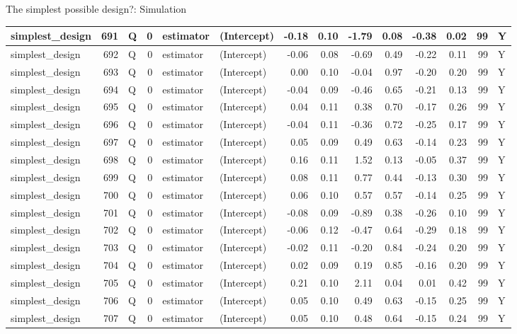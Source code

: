 \documentclass[
  11pt,
  ignorenonframetext,
]{beamer}
\begin{document}
\begin{frame}[fragile]{The simplest possible design?: Simulation}
\begin{tabular}{l|r|l|r|l|l|r|r|r|r|r|r|r|l}
\hline
simplest\_design & 691 & Q & 0 & estimator & (Intercept) & -0.18 & 0.10 & -1.79 & 0.08 & -0.38 & 0.02 & 99 & Y\\
\hline
simplest\_design & 692 & Q & 0 & estimator & (Intercept) & -0.06 & 0.08 & -0.69 & 0.49 & -0.22 & 0.11 & 99 & Y\\
\hline
simplest\_design & 693 & Q & 0 & estimator & (Intercept) & 0.00 & 0.10 & -0.04 & 0.97 & -0.20 & 0.20 & 99 & Y\\
\hline
simplest\_design & 694 & Q & 0 & estimator & (Intercept) & -0.04 & 0.09 & -0.46 & 0.65 & -0.21 & 0.13 & 99 & Y\\
\hline
simplest\_design & 695 & Q & 0 & estimator & (Intercept) & 0.04 & 0.11 & 0.38 & 0.70 & -0.17 & 0.26 & 99 & Y\\
\hline
simplest\_design & 696 & Q & 0 & estimator & (Intercept) & -0.04 & 0.11 & -0.36 & 0.72 & -0.25 & 0.17 & 99 & Y\\
\hline
simplest\_design & 697 & Q & 0 & estimator & (Intercept) & 0.05 & 0.09 & 0.49 & 0.63 & -0.14 & 0.23 & 99 & Y\\
\hline
simplest\_design & 698 & Q & 0 & estimator & (Intercept) & 0.16 & 0.11 & 1.52 & 0.13 & -0.05 & 0.37 & 99 & Y\\
\hline
simplest\_design & 699 & Q & 0 & estimator & (Intercept) & 0.08 & 0.11 & 0.77 & 0.44 & -0.13 & 0.30 & 99 & Y\\
\hline
simplest\_design & 700 & Q & 0 & estimator & (Intercept) & 0.06 & 0.10 & 0.57 & 0.57 & -0.14 & 0.25 & 99 & Y\\
\hline
simplest\_design & 701 & Q & 0 & estimator & (Intercept) & -0.08 & 0.09 & -0.89 & 0.38 & -0.26 & 0.10 & 99 & Y\\
\hline
simplest\_design & 702 & Q & 0 & estimator & (Intercept) & -0.06 & 0.12 & -0.47 & 0.64 & -0.29 & 0.18 & 99 & Y\\
\hline
simplest\_design & 703 & Q & 0 & estimator & (Intercept) & -0.02 & 0.11 & -0.20 & 0.84 & -0.24 & 0.20 & 99 & Y\\
\hline
simplest\_design & 704 & Q & 0 & estimator & (Intercept) & 0.02 & 0.09 & 0.19 & 0.85 & -0.16 & 0.20 & 99 & Y\\
\hline
simplest\_design & 705 & Q & 0 & estimator & (Intercept) & 0.21 & 0.10 & 2.11 & 0.04 & 0.01 & 0.42 & 99 & Y\\
\hline
simplest\_design & 706 & Q & 0 & estimator & (Intercept) & 0.05 & 0.10 & 0.49 & 0.63 & -0.15 & 0.25 & 99 & Y\\
\hline
simplest\_design & 707 & Q & 0 & estimator & (Intercept) & 0.05 & 0.10 & 0.48 & 0.64 & -0.15 & 0.24 & 99 & Y\\

\end{tabular}
\end{frame}
\end{document}
